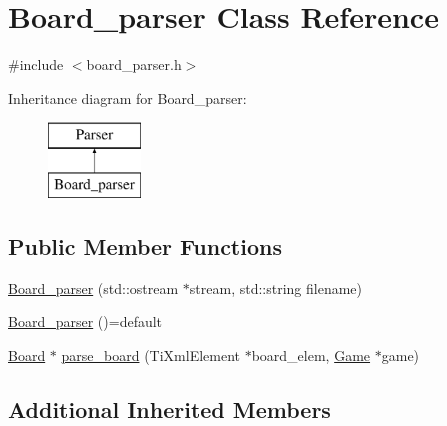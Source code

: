 \hypertarget{class_board__parser}{\section{Board\-\_\-parser Class Reference}
\label{class_board__parser}
}


{\ttfamily \#include $<$board\-\_\-parser.\-h$>$}

Inheritance diagram for Board\-\_\-parser\-:\begin{figure}[H]
\begin{center}
\leavevmode
\includegraphics[height=2.000000cm]{class_board__parser}
\end{center}
\end{figure}
\subsection*{Public Member Functions}
\begin{DoxyCompactItemize}
\item 
\hyperlink{class_board__parser_ac319ba5a336e36cfa2415119d879a9d2}{Board\-\_\-parser} (std\-::ostream $\ast$stream, std\-::string filename)
\item 
\hyperlink{class_board__parser_a99271ae26b210b3624c67aeab38033ae}{Board\-\_\-parser} ()=default
\item 
\hyperlink{class_board}{Board} $\ast$ \hyperlink{class_board__parser_a2487bad5d98829157aa125651fc4fe1c}{parse\-\_\-board} (Ti\-Xml\-Element $\ast$board\-\_\-elem, \hyperlink{class_game}{Game} $\ast$game)
\end{DoxyCompactItemize}
\subsection*{Additional Inherited Members}


